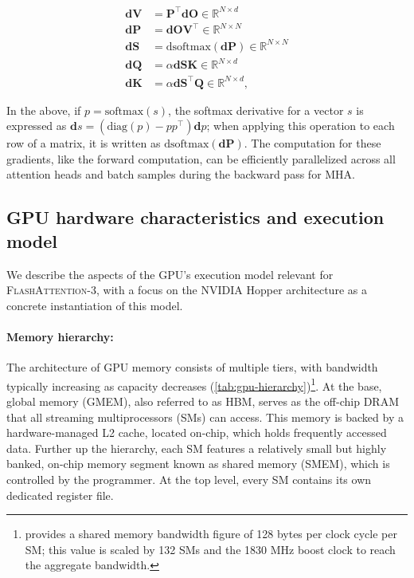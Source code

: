 \begin{align*}
  \mathbf{dV} &= \mathbf{P}^\top \mathbf{dO} \in \mathbb{R}^{N \times d} \\
  \mathbf{dP} &= \mathbf{dO} \mathbf{V}^\top \in \mathbb{R}^{N \times N} \\
  \mathbf{dS} &= \mathrm{dsoftmax} (\mathbf{dP}) \in \mathbb{R}^{N \times N} \\
  \mathbf{dQ} &= \alpha \mathbf{dS} \mathbf{K} \in \mathbb{R}^{N \times d} \\
  \mathbf{dK} &= \alpha \mathbf{dS}^\top \mathbf{Q} \in \mathbb{R}^{N \times d},
\end{align*}

In the above, if $p = \mathrm{softmax}(s)$, the softmax derivative for a vector $s$ is expressed as $\mathbf{d}s = (\mathrm{diag}(p) - p p^\top)\mathbf{d}p$; when applying this operation to each row of a matrix, it is written as $\mathrm{dsoftmax}(\mathbf{dP})$. The computation for these gradients, like the forward computation, can be efficiently parallelized across all attention heads and batch samples during the backward pass for MHA.

\subsection{GPU hardware characteristics and execution model}
\label{subsec:hardware}

We describe the aspects of the GPU's execution model relevant for \textsc{FlashAttention-3}, with a focus on the NVIDIA Hopper architecture as a concrete instantiation of this model.

\paragraph{Memory hierarchy:} The architecture of GPU memory consists of multiple tiers, with bandwidth typically increasing as capacity decreases (\cref{tab:gpu-hierarchy})\footnote{\citet{luo2024benchmarking} provides a shared memory bandwidth figure of 128 bytes per clock cycle per SM; this value is scaled by 132 SMs and the 1830 MHz boost clock to reach the aggregate bandwidth.}. At the base, global memory (GMEM), also referred to as HBM, serves as the off-chip DRAM that all streaming multiprocessors (SMs) can access. This memory is backed by a hardware-managed L2 cache, located on-chip, which holds frequently accessed data. Further up the hierarchy, each SM features a relatively small but highly banked, on-chip memory segment known as shared memory (SMEM), which is controlled by the programmer. At the top level, every SM contains its own dedicated register file.

